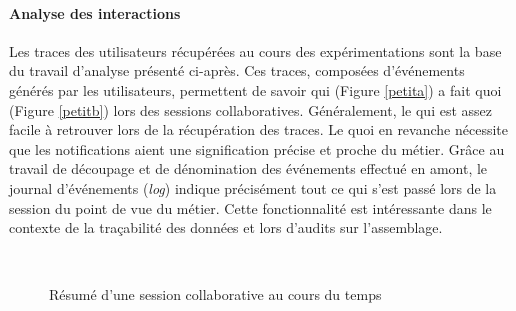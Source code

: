 \paragraph{Analyse des interactions}
Les traces des utilisateurs récupérées au cours des expérimentations sont la base 
du travail d'analyse présenté ci-après. Ces traces, composées d'événements 
générés par les utilisateurs, permettent de savoir qui (Figure \ref{petita}) a fait quoi 
(Figure \ref{petitb}) lors des sessions collaboratives. Généralement, le \og qui\fg{} 
est assez facile à retrouver lors de la récupération des traces. Le \og quoi\fg{} 
en revanche nécessite que les notifications aient une signification précise et proche 
du métier. Grâce au travail de découpage et de dénomination des événements 
effectué en amont, le journal d'événements (\textit{log}) indique précisément tout 
ce qui s'est passé lors de la session du point de vue du métier. Cette 
fonctionnalité est intéressante dans le contexte de la traçabilité des données et 
lors d'audits sur l'assemblage. 

\begin{figure}[]
	\centering
	
	\\
	\caption{Résumé d'une session collaborative au cours du temps}
	\label{fig:collabsession}
\end{figure}

